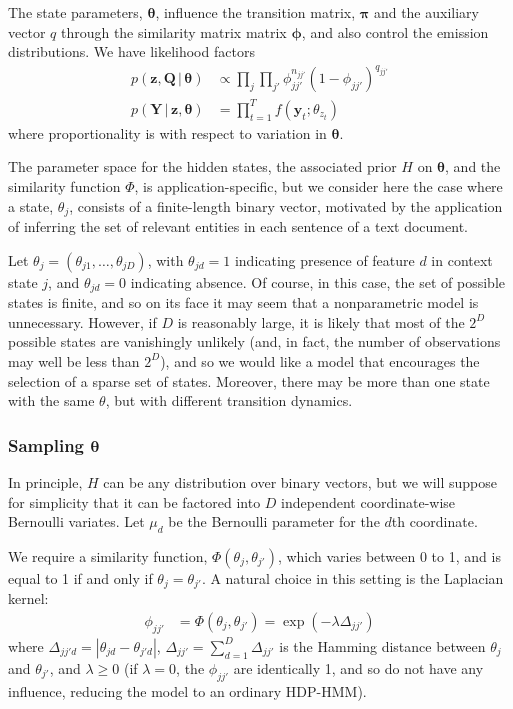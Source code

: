 \documentclass[12pt,letterpaper]{report}
\newcommand{\given}{\, \vert \,}
\newcommand{\abs}[1]{\left\vert #1 \right\vert}
\newcommand{\by}{\mathbf{y}}
\newcommand{\bY}{\mathbf{Y}}
\newcommand{\bQ}{\mathbf{Q}}
\newcommand{\bz}{\mathbf{z}}
\newcommand{\btheta}{\boldsymbol{\theta}}
\newcommand{\bpi}{\boldsymbol{\pi}}
\newcommand{\bphi}{\boldsymbol{\phi}}
\begin{document}
The state parameters, $\btheta$, influence the transition matrix,
$\bpi$ and the auxiliary vector $q$ through the similarity matrix
matrix $\bphi$, and also control the emission distributions.
We have likelihood factors
\begin{align}
  \label{eq:65}
  p(\bz, \bQ \given \btheta) &\propto \prod_{j}\prod_{j'}
  \phi_{jj'}^{n_{jj'}}(1-\phi_{jj'})^{q_{jj'}} \\
  p(\bY \given \bz, \btheta) &= \prod_{t=1}^T f(\by_t; \theta_{z_t})
\end{align}
where proportionality is with respect to variation in $\btheta$.

The parameter space for the hidden states, 
the associated prior $H$ on $\btheta$, and the similarity function
$\Phi$, is application-specific, but we consider here the case where a state,
$\theta_j$, consists of a finite-length binary vector, motivated by the
application of inferring the set of relevant entities in each sentence of
a text document.

Let $\theta_j = (\theta_{j1}, \dots, \theta_{jD})$, with $\theta_{jd} = 1$
indicating presence of feature $d$ in context state $j$, and
$\theta_{jd} = 0$ indicating absence.  Of course, in this case,
the set of possible states is finite, and so on its face it may
seem that a nonparametric model is unnecessary.  However, if $D$ is
reasonably large, it is likely that most of the $2^D$ possible states
are vanishingly unlikely (and, in fact, the number of observations may
well be less than $2^D$), and so we would like a model that encourages
the selection of a sparse set of states.  Moreover, there may be more
than one state with the same $\theta$, but with different transition dynamics.

\subsubsection{Sampling $\btheta$}
\label{sec:sampling-eta}

In principle, $H$ can be any distribution over binary vectors, but we
will suppose for simplicity that it can be factored into $D$
independent coordinate-wise Bernoulli variates.  Let $\mu_d$ be the
Bernoulli parameter for the $d$th coordinate.

We require a similarity function, $\Phi(\theta_j, \theta_{j'})$, which 
varies between 0 to 1, and is equal to 1 if and only if $\theta_j =
\theta_{j'}$.  A natural choice in this setting is the Laplacian kernel:
\begin{align}
  \label{eq:39}
  \phi_{jj'} &= \Phi(\theta_j, \theta_{j'}) = \exp(-\lambda \Delta_{jj'})
\end{align}
where $\Delta_{jj'd} = \abs{\theta_{jd} - \theta_{j'd}}$, $\Delta_{jj'} =
\sum_{d=1}^D \Delta_{jj'}$ is the Hamming
distance between $\theta_j$ and $\theta_{j'}$,
and $\lambda \geq 0$ (if $\lambda = 0$, the $\phi_{jj'}$
are identically 1, and so do not have any influence, reducing the
model to an ordinary HDP-HMM).
\end{document}
